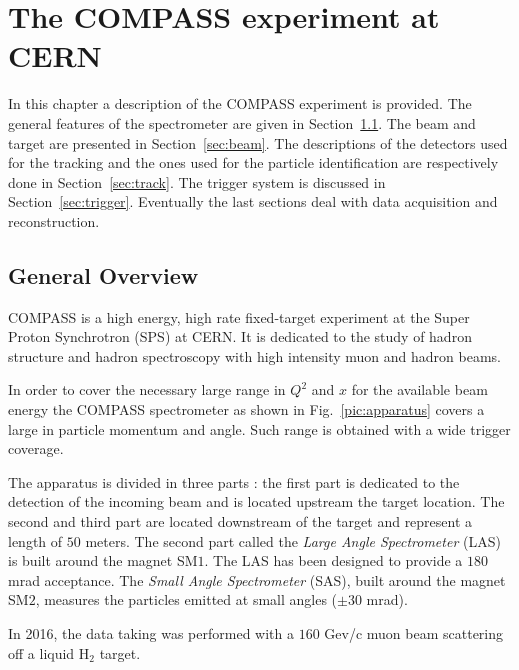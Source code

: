 
\chapter{The COMPASS experiment at CERN} %

\label{ch:exp} %

In this chapter a description of the COMPASS experiment is provided. The general features of the spectrometer are given in Section~\ref{sec:specgen}. The beam and target are presented in Section~\ref{sec:beam}. The descriptions of the detectors used for the tracking and the ones used for the particle identification are respectively done in Section~\ref{sec:track}. The trigger system is discussed in Section~\ref{sec:trigger}. Eventually the last sections deal with data acquisition and reconstruction.


\section{General Overview}\label{sec:specgen}

COMPASS is a high energy, high rate fixed-target experiment at the Super Proton Synchrotron (SPS) at CERN. It is dedicated to the study of hadron structure and hadron spectroscopy with high intensity muon and hadron beams.

In order to cover the necessary large range in $Q^2$ and $x$ for the available beam energy the COMPASS spectrometer as shown in Fig.~\ref{pic:apparatus} covers a large in particle momentum and angle. Such range is obtained with a wide trigger coverage.

The apparatus is divided in three parts : the first part is dedicated to the detection of the incoming beam and is located upstream the target location. The second and third part are located downstream of the target and represent a length of $50$ meters. The second part called the \textit{Large Angle Spectrometer} (LAS) is built around the magnet SM$1$.
The LAS has been designed to provide a $180$ mrad acceptance. The \textit{Small Angle Spectrometer} (SAS), built around the magnet SM$2$, measures the particles emitted at small angles ($\pm30$ mrad).

In 2016, the data taking was performed with a $160$ Gev/c muon beam scattering off a liquid H$_2$ target.

